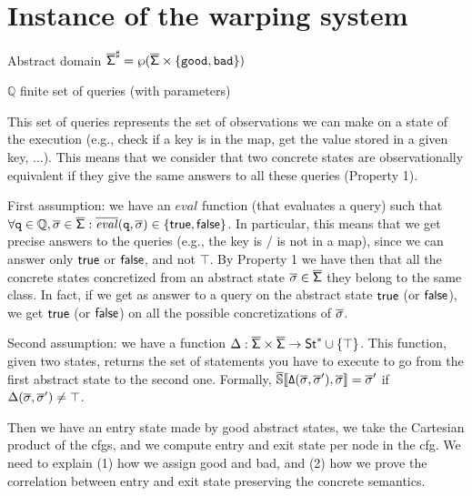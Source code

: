 \section{Instance of the warping system}

Abstract domain $\mathsf{\overline{\Sigma}}^{\sharp} = \wp(\mathsf{\overline{\Sigma}} \times \{\mathtt{good}, \mathtt{bad}\})$

$\mathbb{Q}$ finite set of queries (with parameters)

This set of queries represents the set of observations we can make on a state of the execution (e.g., check if a key is in the map, get the value stored in a given key, ...). This means that we consider that two concrete states are observationally equivalent if they give the same answers to all these queries (Property 1).

First assumption: we have an $eval$ function (that evaluates a query) such that $\forall \mathtt{q} \in \mathbb{Q}, \mathsf{\overline{\sigma}} \in \mathsf{\overline{\Sigma}} : \overline{\mathit{eval}}(\mathtt{q}, \mathsf{\overline{\sigma}}) \in \{\mathsf{true}, \mathsf{false}\}$. In particular, this means that we get precise answers to the queries (e.g., the key is / is not in a map), since we can answer only $\mathsf{true}$ or $\mathsf{false}$, and not $\top$. By Property 1 we have then that all the concrete states concretized from an abstract state $\mathsf{\overline{\sigma}} \in \mathsf{\overline{\Sigma}}$ they belong to the same class. In fact, if we get as answer to a query on the abstract state $\mathsf{true}$ (or $\mathsf{false}$), we get $\mathsf{true}$ (or $\mathsf{false}$) on all the possible concretizations of $\mathsf{\overline{\sigma}}$. 

Second assumption: we have a function $\Delta : \mathsf{\overline{\Sigma}} \times \mathsf{\overline{\Sigma}} \rightarrow\mathsf{St}^*\cup \{\top\}$. This function, given two states, returns the set of statements you have to execute to go from the first abstract state to the second one. Formally, $\mathbb{\overline{\mathit{\mathbb{S}}}}\llbracket \mathtt{\Delta(\mathsf{\overline{\sigma}}, \mathsf{\overline{\sigma}}'),\mathsf{\overline{\sigma}}} \rrbracket=\mathsf{\overline{\sigma}}'$ if $\Delta(\mathsf{\overline{\sigma}}, \mathsf{\overline{\sigma}}') \neq \top$.

Then we have an entry state made by good abstract states, we take the Cartesian product of the cfgs, and we compute entry and exit state per node in the cfg. We need to explain (1) how we assign good and bad, and (2) how we prove the correlation between entry and exit state preserving the concrete semantics.
